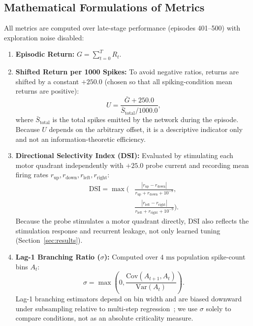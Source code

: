 \documentclass[journal]{IEEEtran}
\begin{document}
\subsection{Mathematical Formulations of Metrics}
All metrics are computed over late-stage performance (episodes 401--500) with exploration noise disabled:
\begin{enumerate}
    \item \textbf{Episodic Return:} $G = \sum_{t=0}^{T} R_t$.
    \item \textbf{Shifted Return per 1000 Spikes:} To avoid negative ratios, returns are shifted by a constant $+250.0$ (chosen so that all spiking-condition mean returns are positive):
    \begin{equation}
    U = \frac{\bar{G} + 250.0}{\bar{S}_{\mathrm{total}} / 1000.0},
    \label{eq:utility}
    \end{equation}
    where $\bar{S}_{\mathrm{total}}$ is the total spikes emitted by the network during the episode. Because $U$ depends on the arbitrary offset, it is a descriptive indicator only and not an information-theoretic efficiency.
    \item \textbf{Directional Selectivity Index (DSI):} Evaluated by stimulating each motor quadrant independently with $+25.0$ probe current and recording mean firing rates $r_{\mathrm{up}}, r_{\mathrm{down}}, r_{\mathrm{left}}, r_{\mathrm{right}}$:
    \begin{equation}
    \begin{aligned}
    \text{DSI} = \max\Biggl( & \frac{|r_{\mathrm{up}} - r_{\mathrm{down}}|}{r_{\mathrm{up}} + r_{\mathrm{down}} + 10^{-9}}, \\
    & \frac{|r_{\mathrm{left}} - r_{\mathrm{right}}|}{r_{\mathrm{left}} + r_{\mathrm{right}} + 10^{-9}} \Biggr).
    \end{aligned}
    \label{eq:dsi}
    \end{equation}
    Because the probe stimulates a motor quadrant directly, DSI also reflects the stimulation response and recurrent leakage, not only learned tuning (Section~\ref{sec:results}).
    \item \textbf{Lag-1 Branching Ratio ($\sigma$):} Computed over $4\text{ ms}$ population spike-count bins $A_t$:
    \begin{equation}
    \sigma = \max\left(0, \frac{\mathrm{Cov}(A_{t+1}, A_t)}{\mathrm{Var}(A_t)}\right).
    \label{eq:branching}
    \end{equation}
    Lag-1 branching estimators depend on bin width and are biased downward under subsampling relative to multi-step regression~\cite{Wilting2018Criticality}; we use $\sigma$ solely to compare conditions, not as an absolute criticality measure.

\end{enumerate}
\end{document}
